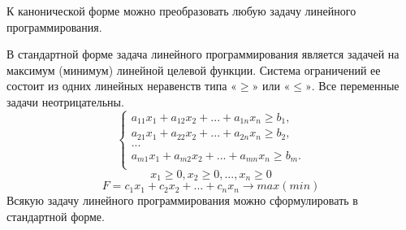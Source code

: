 \documentclass[12pt]{article}
\begin{document}
К канонической форме можно преобразовать любую задачу линейного
программирования.

В стандартной форме задача линейного программирования является задачей на
максимум (минимум) линейной целевой функции. Система ограничений ее состоит из
одних линейных неравенств типа $«\ge»$ или $«\le»$. Все переменные задачи
неотрицательны.
\begin{equation}
 \begin{cases}
  a_{11}x_1 +a_{12}x_2+...+a_{1n}x_n \ge b_1,\\ 
  a_{21}x_1 +a_{22}x_2+...+a_{2n}x_n \ge b_2,\\
  ...\\
  a_{m1}x_1 +a_{m2}x_2+...+a_{mn}x_n\ge b_m.\\
 \end{cases}
\end{equation}
\begin{equation}
x_1\ge0, x_2\ge0, ..., x_n\ge0
\end{equation}
\begin{equation}
F=c_1x_1+c_2x_2 + ... + c_nx_n \rightarrow max(min)
\end{equation}
Всякую задачу линейного программирования можно сформулировать в
стандартной форме.
\newpage
\end{document}
